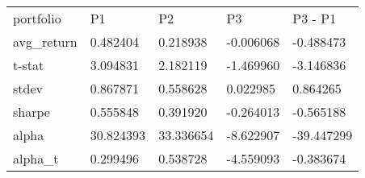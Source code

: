 \begin{tabular}{lllll}
\toprule
\midrule
portfolio & P1 & P2 & P3 & P3 - P1 \\
avg_return & 0.482404 & 0.218938 & -0.006068 & -0.488473 \\
t-stat & 3.094831 & 2.182119 & -1.469960 & -3.146836 \\
stdev & 0.867871 & 0.558628 & 0.022985 & 0.864265 \\
sharpe & 0.555848 & 0.391920 & -0.264013 & -0.565188 \\
alpha & 30.824393 & 33.336654 & -8.622907 & -39.447299 \\
alpha_t & 0.299496 & 0.538728 & -4.559093 & -0.383674 \\
\bottomrule
\end{tabular}
